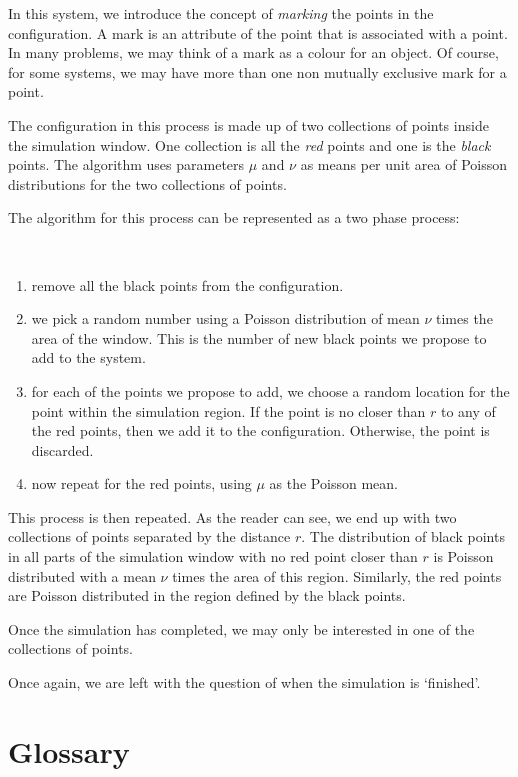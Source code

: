 In this system, we introduce the concept of \emph{marking} the points
in the configuration.  A mark is an attribute of the point that is
associated with a point.  In many problems, we may think of a mark as
a colour for an object.  Of course, for some systems, we may have more
than one non mutually exclusive mark for a point.

The configuration in this process is made up of two collections of
points inside the simulation window.  One collection is all the
\emph{red} points and one is the \emph{black} points.  The algorithm
uses parameters $\mu$ and $\nu$ as means per unit area of Poisson
distributions for the two collections of points.

The algorithm for this process can be represented as a two phase
process:
\begin{algorithm}
\ 

\begin{enumerate}
\item remove all the black points from the configuration.
\item we pick a random number using a Poisson distribution of mean
$\nu$ times the area of the window.  This is the number of new
black points we propose to add to the system.
\item for each of the points we propose to add, we choose a random
location for the point within the simulation region.  If the point is
no closer than $r$ to any of the red points, then we add it to the
configuration.  Otherwise, the point is discarded.
\item now repeat for the red points, using $\mu$ as the Poisson mean.
\end{enumerate}
\end{algorithm}

This process is then repeated.  As the reader can see, we end up with
two collections of points separated by the distance $r$.  The
distribution of black points in all parts of the simulation window
with no red point closer than $r$ is Poisson distributed with a mean
$\nu$ times the area of this region.  Similarly, the red points are
Poisson distributed in the region defined by the black points.

Once the simulation has completed, we may only be interested in one of
the collections of points.

Once again, we are left with the question of when the simulation is
`finished'.

\section{Glossary}\label{sect:glossary}

